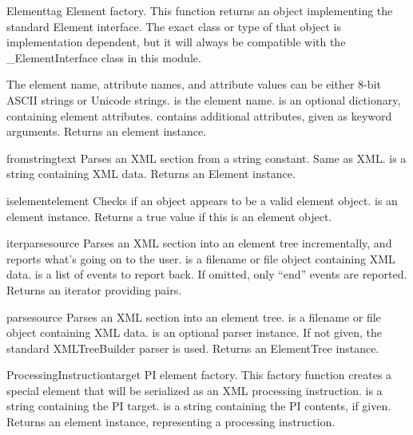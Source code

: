 \begin{funcdesc}{Element}{tag}
Element factory.  This function returns an object implementing the
standard Element interface.  The exact class or type of that object
is implementation dependent, but it will always be compatible with
the {\_}ElementInterface class in this module.

The element name, attribute names, and attribute values can be
either 8-bit ASCII strings or Unicode strings.
 is the element name.
 is an optional dictionary, containing element attributes.
 contains additional attributes, given as keyword arguments.
Returns an element instance.
\end{funcdesc}

\begin{funcdesc}{fromstring}{text}
Parses an XML section from a string constant.  Same as XML.
 is a string containing XML data.
Returns an Element instance.
\end{funcdesc}

\begin{funcdesc}{iselement}{element}
Checks if an object appears to be a valid element object.
 is an element instance.
Returns a true value if this is an element object.
\end{funcdesc}

\begin{funcdesc}{iterparse}{source}
Parses an XML section into an element tree incrementally, and reports
what's going on to the user.
 is a filename or file object containing XML data.
 is a list of events to report back.  If omitted, only ``end''
events are reported.
Returns an iterator providing  pairs.
\end{funcdesc}

\begin{funcdesc}{parse}{source}
Parses an XML section into an element tree.
 is a filename or file object containing XML data.
 is an optional parser instance.  If not given, the
standard XMLTreeBuilder parser is used.
Returns an ElementTree instance.
\end{funcdesc}

\begin{funcdesc}{ProcessingInstruction}{target}
PI element factory.  This factory function creates a special element
that will be serialized as an XML processing instruction.
 is a string containing the PI target.
 is a string containing the PI contents, if given.
Returns an element instance, representing a processing instruction.
\end{funcdesc}

